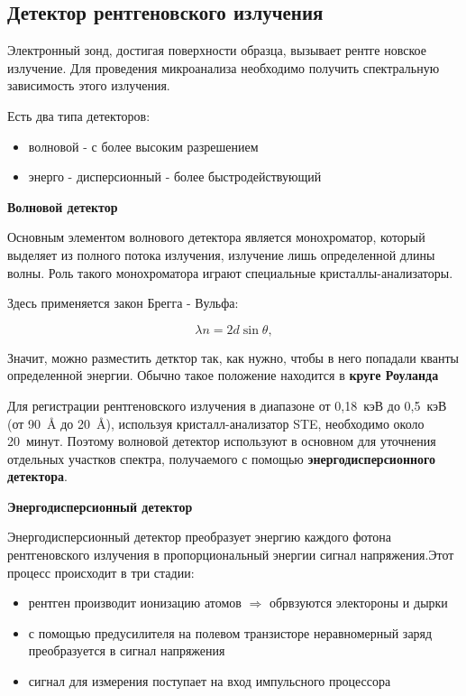 \documentclass[12pt]{article}
\begin{document}
\subsection{Детектор рентгеновского излучения}

Электронный зонд, достигая поверхности образца, вызывает рентге
новское излучение. Для проведения микроанализа необходимо получить 
спектральную зависимость этого излучения.


Есть два типа детекторов:

\begin{itemize}
  \item волновой - с более высоким разрешением
  \item энерго - дисперсионный - более быстродействующий
\end{itemize}

\textbf{Волновой детектор}


Основным элементом волнового детектора является  монохроматор, 
который  выделяет из полного потока излучения, излучение лишь определенной длины волны. Роль такого монохроматора играют специальные 
кристаллы-анализаторы.


Здесь применяется закон Брегга - Вульфа:

\[
\lambda n = 2d \sin \theta,\tag{9}
\]

Значит, можно разместить детктор так, как нужно, чтобы в него попадали кванты определенной энергии. Обычно такое положение находится в \textbf{круге Роуланда}


Для регистрации рентгеновского излучения в диапазоне от 0,18~кэВ до 0,5~кэВ (от 90~\AA{} до 20~\AA), используя кристалл-анализатор STE, необходимо около 20~минут. Поэтому волновой детектор используют в основном для уточнения отдельных участков спектра, получаемого с помощью \textbf{энергодисперсионного детектора}.


\textbf{Энергодисперсионный детектор}

Энергодисперсионный детектор преобразует энергию каждого фотона 
рентгеновского излучения в пропорциональный энергии сигнал напряжения.Этот процесс происходит в три стадии:

\newpage

\begin{itemize}
  \item рентген производит ионизацию атомов $\Rightarrow $ обрвзуются электороны и дырки
  \item с помощью предусилителя на полевом транзисторе неравномерный заряд преобразуется в сигнал напряжения
  \item сигнал для измерения поступает на вход импульсного процессора
\end{itemize}
\end{document}
